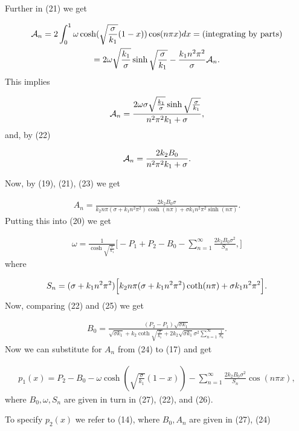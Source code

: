 \documentclass[times]{nlaauth}%
\begin{document}
Further in (21) we get 

\begin {gather}
{\cal A}_n = 2 \int _0^1 \omega \cosh(\sqrt{\frac{\sigma}{k_1}}(1-x)) \cos (n\pi x) dx 
= (\mbox{integrating by parts} )\nonumber \\
= 2\omega \sqrt {\frac{k_1}{\sigma}}\sinh \sqrt{\frac{\sigma}{k_1}} - \frac{k_1n^2\pi^2}{\sigma} {\cal A}_n .\nonumber
\end {gather}
This implies


\begin {gather}
{\cal A}_n = 
\frac{2\omega \sigma \sqrt {\frac{k_1}{\sigma}}\sinh \sqrt{\frac{\sigma}{k_1}}}{{n^2\pi^2 k_1 + \sigma}  },\nonumber
\end {gather}
and, by (22)


\begin {gather}
{\cal A}_n = \frac{2 k_2 B_0}{n^2\pi^2 k_1 + \sigma}  .
\end {gather}

Now, by (19), (21), (23) we get

\begin {gather}
A_n = \frac{2 k_2 B_0 \sigma}{k_2 n \pi (\sigma + k_1 n^2 \pi^2)\cosh (n\pi) + \sigma k_1 n^2 \pi^2 \sinh (n\pi)}.
\end {gather}
Putting this into (20) we get

\begin {gather}
\omega = \frac{1}{\cosh\sqrt{\frac{\sigma}{k_1}}}\bigl[
-P_1 + P_2 - B_0 - \sum^{\infty}_{n=1} \frac{2 k_2 B_0 \sigma^2}{S_n},
\Bigr]
\end {gather}
where 


\begin {gather}
S_n = (\sigma + k_1 n^2 \pi^2)\Bigl[
k_2 n \pi (\sigma + k_1 n^2 \pi^2)\coth (n\pi)+ \sigma k_1 n^2 \pi^2
\Bigr].
\end {gather}
Now, comparing (22) and (25) we get


\begin {gather}
\boxed{
B_0 = \frac{(P_2-P_1) \sqrt{\sigma k_1} }{\sqrt{\sigma k_1} + k_2 \coth \sqrt {\frac{\sigma}{k_1}} 
+ 2 k_2  \sqrt{\sigma k_1} \sigma^2  \sum^{\infty}_{n=1} \frac{1}{S_n}    }
} .
\end {gather}
Now we can substitute for $A_n$ from (24) to (17) and get



\begin {gather}
p_1 (x) = P_2 - B_0 - \omega  \cosh(\sqrt{\frac{\sigma}{k_1}}(1-x)) 
- \sum^{\infty}_{n=1} \frac{2 k_2 B_0 \sigma^2}{S_n}  \cos (n \pi x) , 
\end {gather}
where $B_0, \omega, S_n$ are given in turn in (27), (22), and (26).
\par
To specify $p_2(x)$ we refer to (14), where $B_0, A_n$ are given in (27), (24)
\end{document}
